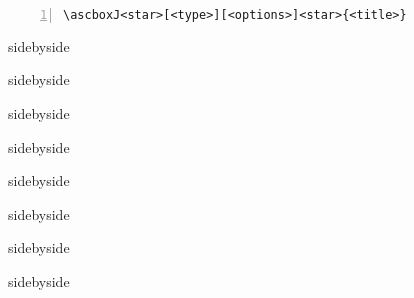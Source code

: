 \begin{lstlisting}[backgroundcolor=\color{gray!5},framerule=1pt,frame=tb,numbers=left,
    numberstyle=\tiny\color{black},]
\ascboxJ<star>[<type>][<options>]<star>{<title>}
\end{lstlisting}


\begin{tcblisting}{sidebyside}
    
\end{tcblisting}

\begin{tcblisting}{sidebyside}
    
\end{tcblisting}



\begin{tcblisting}{sidebyside}
    
\end{tcblisting}

\begin{tcblisting}{sidebyside}
    
\end{tcblisting}


\begin{tcblisting}{sidebyside}
    
\end{tcblisting}

\begin{tcblisting}{sidebyside}
    
\end{tcblisting}

\begin{tcblisting}{sidebyside}
    
\end{tcblisting}

\begin{tcblisting}{sidebyside}
    
\end{tcblisting}

